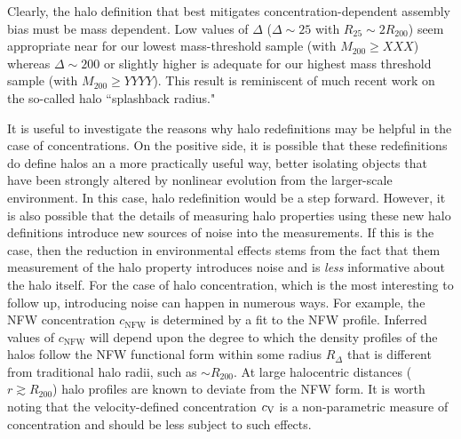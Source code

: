 \documentclass[usenatbib,usegraphicx,letterpaper]{mn2e}
\begin{document}
Clearly, the halo definition that best mitigates 
concentration-dependent assembly bias must be mass dependent. Low 
values of $\Delta$ ($\Delta \sim 25$ with $R_{25} \sim 2R_{200}$) seem appropriate near for our lowest 
mass-threshold sample (with $M_{200} \ge XXX$) whereas $\Delta \sim 200$ or slightly higher is adequate for 
our highest mass threshold sample (with $M_{200} \ge YYYY$). This result is reminiscent of much 
recent work on the so-called halo ``splashback radius." 




It is useful to investigate the reasons why halo redefinitions may be helpful in the case 
of concentrations. On the positive side, it is possible that these redefinitions do define 
halos an a more practically useful way, better isolating objects that have been strongly 
altered by nonlinear evolution from the larger-scale environment. In this case, halo redefinition 
would be a step forward. However, it is also possible that the details of measuring halo 
properties using these new halo definitions introduce new sources of noise into the 
measurements. If this is the case, then the reduction in environmental effects stems 
from the fact that them measurement of the halo property 
introduces noise and is {\em less} informative about the halo itself. 
For the case of halo concentration, which is the most interesting to 
follow up, introducing noise can happen in numerous ways. For example, 
the NFW concentration $c_{\mathrm{NFW}}$ is determined by a fit to the 
NFW profile. Inferred values of $c_{\mathrm{NFW}}$ will depend upon 
the degree to which the density profiles of the halos follow the NFW 
functional form within some radius $R_{\Delta}$ that is different from 
traditional halo radii, such as $\sim R_{200}$. At large halocentric 
distances ($r \gtrsim R_{200}$) halo profiles are known to deviate 
from the NFW form. It is worth noting that the velocity-defined concentration 
$c_{\rm V}$ is a non-parametric measure of concentration and should be 
less subject to such effects. 
\end{document}
